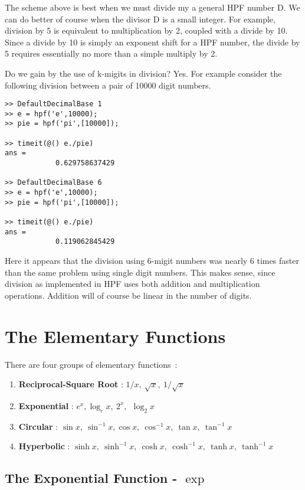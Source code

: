 \documentclass[a4paper,12pt]{article}
\begin{document}
The scheme above is best when we must divide my a general HPF number D. We can do better of course when the divisor D is a small integer. For example, division by 5 is equivalent to multiplication by 2, coupled with a divide by 10. Since a divide by 10 is simply an exponent shift for a HPF number, the divide by 5 requires essentially no more than a simple multiply by 2.

Do we gain by the use of k-migits in division? Yes. For example consider the following division between a pair of 10000 digit numbers.

\begin{lstlisting}
>> DefaultDecimalBase 1
>> e = hpf('e',10000);
>> pie = hpf('pi',[10000]);

>> timeit(@() e./pie)
ans =
            0.629758637429

>> DefaultDecimalBase 6
>> e = hpf('e',10000);
>> pie = hpf('pi',[10000]);

>> timeit(@() e./pie)
ans =
            0.119062845429
\end{lstlisting}

Here it appears that the division using 6-migit numbers was nearly 6 times faster than the same problem using single digit numbers. This makes sense, since division as implemented in HPF uses both addition and multiplication operations. Addition will of course be linear in the number of digits.

\section{The Elementary Functions}

There are four groups of elementary functions~:
\begin{enumerate}
  \item \textbf{Reciprocal-Square Root} : $1/x,\ \sqrt{x},\ 1/\sqrt{x}$
  \item \textbf{Exponential} : $ e^x,\log_e{x}, \ 2^x,\ \ \log_2x$
  \item \textbf{Circular} : $\sin{x},\ \sin^{-1}{x},\cos{x},\ \cos^{-1}{x},\ \tan{x},\ \tan^{-1}{x}$
  \item \textbf{Hyperbolic} : $\sinh{x},\ \sinh^{-1}{x},\ \cosh{x},\ \cosh^{-1}{x},\ \tanh{x},\ \tanh^{-1}{x}$
\end{enumerate}


\subsection{The Exponential Function - $\exp$}
\end{document}
